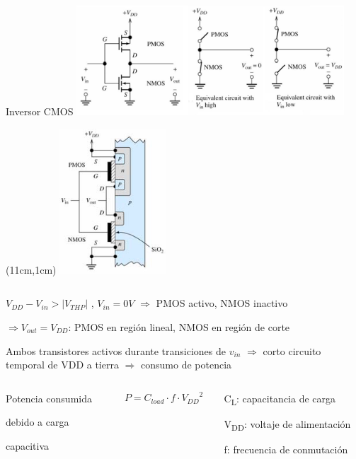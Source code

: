 \documentclass[aspectratio=169,t]{beamer}
\begin{document}
\begin{frame}{Inversor CMOS}
\includegraphics[width=10cm]{inverter1}

\begin{textblock*}{4cm}(11cm,1cm)
	\includegraphics[width=4cm]{inverter2}
\end{textblock*}

\begin{columns}
\begin{column}{0.7\textwidth}
$ V_{DD} - V_{in} > |V_{THP}|$ , $V_{in} = 0 V$ $\Rightarrow$ PMOS activo, NMOS inactivo

$\Rightarrow V_{out} = V_{DD}$: PMOS en región lineal, NMOS en región de corte

\vspace{2mm}
Ambos transistores activos durante transiciones de $v_{in}$ $\Rightarrow$ corto circuito temporal de VDD a tierra $\Rightarrow$ consumo de potencia
\end{column}
\begin{column}{0.3\textwidth}
\end{column}
\end{columns}

\vspace{2mm}
\begin{columns}
\begin{column}{0.3\textwidth}
	\centering Potencia consumida
	
	debido a carga
	
	capacitiva
\end{column}
\begin{column}{0.3\textwidth}
	\[ P = C_{load} \cdot f \cdot {V_{DD}}^2 \]
\end{column}
\begin{column}{0.4\textwidth}
	C\textsubscript{L}: capacitancia de carga
	
	V\textsubscript{DD}: voltaje de alimentación
	
	f: frecuencia de conmutación
\end{column}
\end{columns}

\end{frame}
\end{document}
